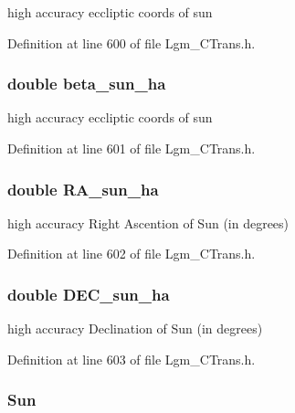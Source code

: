 high accuracy eccliptic coords of sun 



Definition at line 600 of file Lgm\_\-CTrans.h.\hypertarget{struct_lgm___c_trans_68c9bad85ddaa182e024fb793c0cf7a2}{
\subsubsection[{beta\_\-sun\_\-ha}]{\setlength{\rightskip}{0pt plus 5cm}double {\bf beta\_\-sun\_\-ha}}}
\label{struct_lgm___c_trans_68c9bad85ddaa182e024fb793c0cf7a2}


high accuracy eccliptic coords of sun 



Definition at line 601 of file Lgm\_\-CTrans.h.\hypertarget{struct_lgm___c_trans_82cbad2cb80fd7db9be45cd4c1044587}{
\subsubsection[{RA\_\-sun\_\-ha}]{\setlength{\rightskip}{0pt plus 5cm}double {\bf RA\_\-sun\_\-ha}}}
\label{struct_lgm___c_trans_82cbad2cb80fd7db9be45cd4c1044587}


high accuracy Right Ascention of Sun (in degrees) 



Definition at line 602 of file Lgm\_\-CTrans.h.\hypertarget{struct_lgm___c_trans_970dd30b9acfc69613ebe93c102ccdc7}{
\subsubsection[{DEC\_\-sun\_\-ha}]{\setlength{\rightskip}{0pt plus 5cm}double {\bf DEC\_\-sun\_\-ha}}}
\label{struct_lgm___c_trans_970dd30b9acfc69613ebe93c102ccdc7}


high accuracy Declination of Sun (in degrees) 



Definition at line 603 of file Lgm\_\-CTrans.h.\hypertarget{struct_lgm___c_trans_ba9ef9d70bc79513848a5fe50faed070}{
\subsubsection[{Sun}]{ {\bf Sun}}}
\label{struct_lgm___c_trans_ba9ef9d70bc79513848a5fe50faed070}


